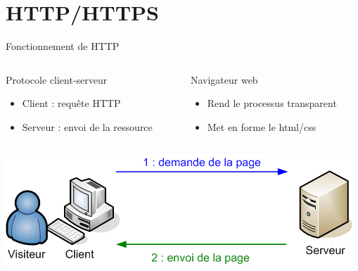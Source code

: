\section{HTTP/HTTPS}


\begin{frame}{Fonctionnement de HTTP}
    \begin{columns}
        \begin{column}{0.5\textwidth}
            \begin{block}{Protocole client-serveur}
                \begin{itemize}
                    \item{Client : requête HTTP}
                    \item{Serveur : envoi de la ressource}
                \end{itemize}
            \end{block}
        \end{column}

        \begin{column}{0.5\textwidth}
            \begin{exampleblock}{Navigateur web}
                \begin{itemize}
                    \item{Rend le processus transparent}
                    \item{Met en forme le html/css}
                \end{itemize}
            \end{exampleblock}
        \end{column}
    \end{columns}

    \hspace{40cm}

    \includegraphics[width=\linewidth]{../medias/requete-http.png}
\end{frame}


